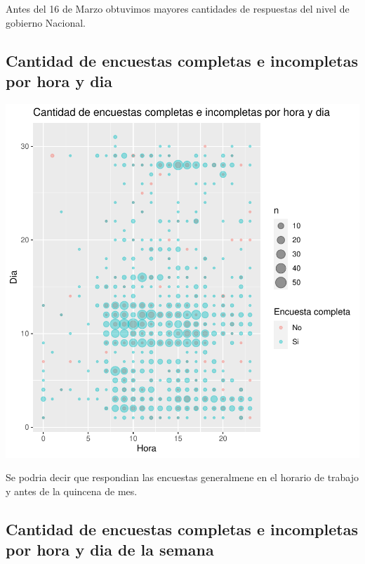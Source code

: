 \documentclass{article}
\begin{document}
Antes del 16 de Marzo obtuvimos mayores cantidades de respuestas del nivel de gobierno Nacional.

\subsection{Cantidad de encuestas completas e incompletas por hora y dia}

\includegraphics{seguimientov3-008}

Se podria decir que respondian las encuestas generalmene en el horario de trabajo y antes de la quincena de mes.

\subsection{Cantidad de encuestas completas e incompletas por hora y dia de la semana}
\end{document}
